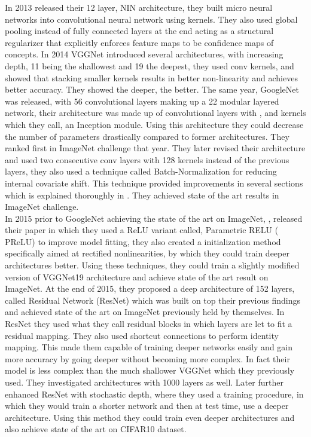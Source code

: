 \documentclass{article} \usepackage{lets_keepit_simple,times}
\begin{document}
In 2013 \cite{Lin_NIN_2013} released their 12 layer, NIN architecture, they built micro neural networks into convolutional neural network using  kernels. They also used global pooling instead of fully connected layers at the end acting as a structural regularizer that explicitly enforces feature maps to be confidence maps of concepts. In 2014 VGGNet \cite{Simonyan_VGG_2014} introduced several architectures, with increasing depth, 11 being the shallowest and 19 the deepest, they used  conv kernels, and showed that stacking smaller kernels results in better non-linearity and achieves better accuracy. They showed the deeper, the better. The same year, GoogleNet \cite{Szegedy_googlenet_2015} was released, with 56 convolutional layers making up a 22 modular layered network, their architecture was made up of convolutional layers with ,  and  kernels which they call, an Inception module. Using this architecture they could decrease the number of parameters drastically compared to former architectures. They ranked first in ImageNet challenge that year. They later revised their architecture and used two consecutive  conv layers with 128 kernels instead of the previous  layers, they also used a technique called Batch-Normalization \cite{Ioffe_BatchNorm_incepv2_2015} for reducing internal covariate shift. This technique provided improvements in several sections which is explained thoroughly in \cite{Ioffe_BatchNorm_incepv2_2015}. They achieved state of the art results in ImageNet challenge.\\ 
In 2015 prior to GoogleNet achieving the state of the art on ImageNet, \cite{He_PReLU_2015}, released their paper in which they used a ReLU variant called, Parametric RELU ( PReLU) to improve model fitting, they also created a initialization method specifically aimed at rectified nonlinearities, by which they could train deeper architectures better. Using these techniques, they could train a slightly modified version of VGGNet19 \cite{Simonyan_VGG_2014} architecture and achieve state of the art result on ImageNet. At the end of 2015, they proposed a deep architecture of 152 layers, called Residual Network (ResNet) \cite{He_ResNet_2015} which was built on top their previous findings and achieved state of the art on ImageNet previously held by themselves. In ResNet they used what they call residual blocks in which layers are let to fit a residual mapping. They also used shortcut connections to perform identity mapping. This made them capable of training deeper networks easily and gain more accuracy by going deeper without becoming more complex. In fact their model is less complex than the much shallower VGGNet \cite{Simonyan_VGG_2014} which they previously used. They investigated architectures with 1000 layers as well. Later \cite{Huang_DeepNN_StochDepth_2016} further enhanced ResNet with stochastic depth, where they used a training procedure, in which they would train a shorter network and then at test time, use a deeper architecture. Using this method they could train even deeper architectures and also achieve state of the art on CIFAR10 dataset.\\ 
\end{document}

